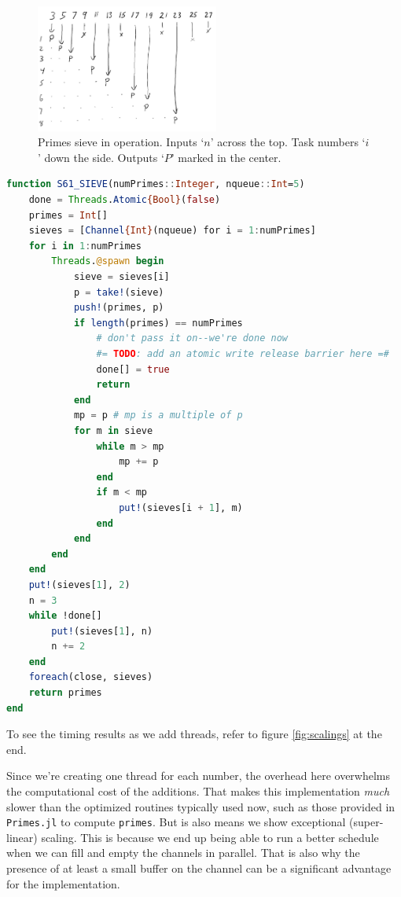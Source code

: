 \documentclass{juliacon}
\begin{document}
\begin{figure}[ht]
\centerline{\includegraphics[width=6cm]{images/threads_sieve.png}}
\caption{Primes sieve in operation. Inputs `$n$' across the top. Task numbers `$i$' down the side. Outputs `$P$' marked in the center.}
\label{fig:sieve}
\end{figure}

\begin{lstlisting}[language = Julia]
function S61_SIEVE(numPrimes::Integer, nqueue::Int=5)
    done = Threads.Atomic{Bool}(false)
    primes = Int[]
    sieves = [Channel{Int}(nqueue) for i = 1:numPrimes]
    for i in 1:numPrimes
        Threads.@spawn begin
            sieve = sieves[i]
            p = take!(sieve)
            push!(primes, p)
            if length(primes) == numPrimes
                # don't pass it on--we're done now
                #= TODO: add an atomic write release barrier here =#
                done[] = true
                return
            end
            mp = p # mp is a multiple of p
            for m in sieve
                while m > mp
                    mp += p
                end
                if m < mp
                    put!(sieves[i + 1], m)
                end
            end
        end
    end
    put!(sieves[1], 2)
    n = 3
    while !done[]
        put!(sieves[1], n)
        n += 2
    end
    foreach(close, sieves)
    return primes
end
\end{lstlisting}

To see the timing results as we add threads, refer to figure \ref{fig:scalings} at the end.

Since we're creating one thread for each number, the overhead here overwhelms the computational cost of the additions. That makes this implementation \textit{much} slower than the optimized routines typically used now, such as those provided in \verb|Primes.jl| to compute \verb|primes|. But is also means we show exceptional (super-linear) scaling. This is because we end up being able to run a better schedule when we can fill and empty the channels in parallel. That is also why the presence of at least a small buffer on the channel can be a significant advantage for the implementation.
\end{document}
